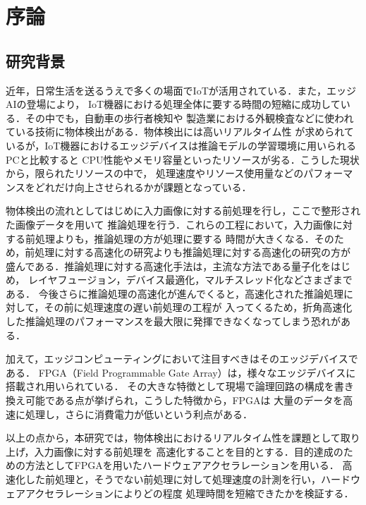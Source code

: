 \documentclass[11pt,a4j]{jreport}
\begin{document}
\chapter{序論} %

\section{研究背景}

近年，日常生活を送るうえで多くの場面でIoTが活用されている．また，エッジAIの登場により，
IoT機器における処理全体に要する時間の短縮に成功している．その中でも，自動車の歩行者検知や
製造業における外観検査などに使われている技術に物体検出がある．物体検出には高いリアルタイム性
が求められているが，IoT機器におけるエッジデバイスは推論モデルの学習環境に用いられるPCと比較すると
CPU性能やメモリ容量といったリソースが劣る．こうした現状から，限られたリソースの中で，
処理速度やリソース使用量などのパフォーマンスをどれだけ向上させられるかが課題となっている．

物体検出の流れとしてはじめに入力画像に対する前処理を行し，ここで整形された画像データを用いて
推論処理を行う．これらの工程において，入力画像に対する前処理よりも，推論処理の方が処理に要する
時間が大きくなる．そのため，前処理に対する高速化の研究よりも推論処理に対する高速化の研究の方が
盛んである．推論処理に対する高速化手法\cite{AccelTemp}は，主流な方法である量子化をはじめ，
レイヤフュージョン，デバイス最適化，マルチスレッド化などさまざまである．
今後さらに推論処理の高速化が進んでくると，高速化された推論処理に対して，その前に処理速度の遅い前処理の工程が
入ってくるため，折角高速化した推論処理のパフォーマンスを最大限に発揮できなくなってしまう恐れがある．

加えて，エッジコンピューティングにおいて注目すべきはそのエッジデバイスである．
FPGA（Field Programmable Gate Array）は，様々なエッジデバイスに搭載され用いられている．
その大きな特徴として現場で論理回路の構成を書き換え可能である点が挙げられ，こうした特徴から，FPGAは
大量のデータを高速に処理し，さらに消費電力が低いという利点がある．

以上の点から，本研究では，物体検出におけるリアルタイム性を課題として取り上げ，入力画像に対する前処理を
高速化することを目的とする．目的達成のための方法としてFPGAを用いたハードウェアアクセラレーションを用いる．
高速化した前処理と，そうでない前処理に対して処理速度の計測を行い，ハードウェアアクセラレーションによりどの程度
処理時間を短縮できたかを検証する．
\end{document}
